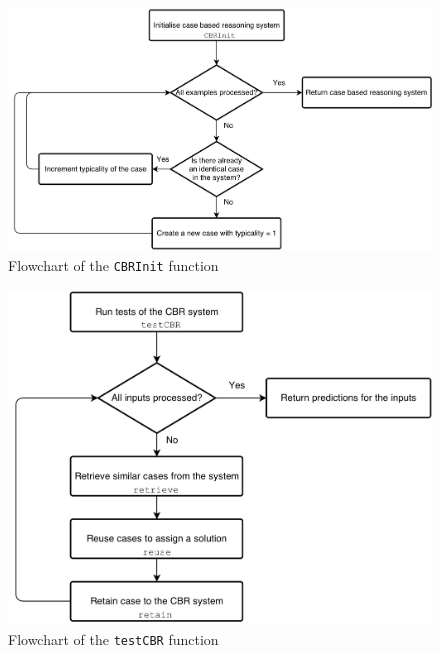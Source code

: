 \documentclass[a4paper]{article}
\begin{document}
\begin{figure}[H]
\center
\includegraphics[width=0.9\columnwidth]{CBRInit}
\caption{Flowchart of the \texttt{CBRInit} function}
\label{flowchartCBRInit}
\end{figure}

\begin{figure}[H]
\center
\includegraphics[width=0.9\columnwidth]{testCBR}
\caption{Flowchart of the \texttt{testCBR} function}
\label{flowchartTestCBR}
\end{figure}

\clearpage

\end{document}
